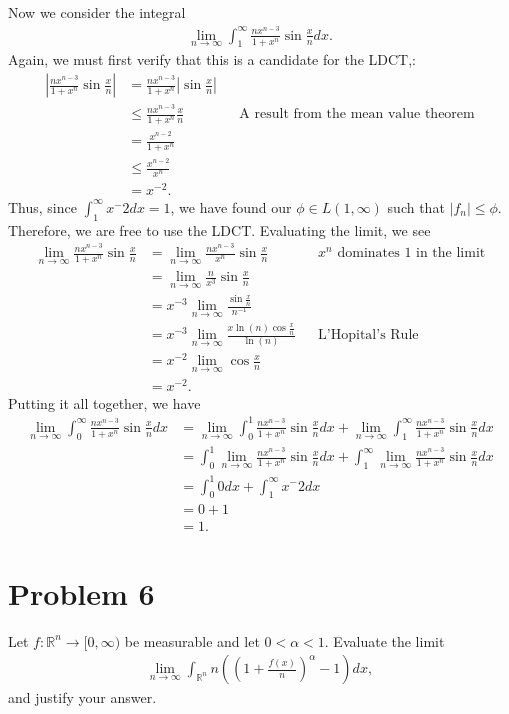 \documentclass[10pt,a4paper]{article}
\theoremstyle{theorem}
\theoremstyle{definition}
\begin{document}
Now we consider the integral 
\begin{align*}
\lim_{n \to \infty} \int_1^\infty \frac{n x^{n - 3}}{1 + x^n}\sin \frac{x}{n} dx.
\end{align*}
Again, we must first verify that this is a candidate for the LDCT,:
\begin{align*}
\left|\frac{n x^{n - 3}}{1 + x^n}\sin \frac{x}{n} \right| &= \frac{n x^{n - 3}}{1 + x^n} \left| \sin \frac{x}{n} \right|\\
&\leq \frac{n x^{n - 3}}{1 + x^n} \frac{x}{n} &&\text{A result from the mean value theorem}\\
&= \frac{x^{n - 2}}{1 + x^n}\\
&\leq \frac{x^{n - 2}}{x^n}\\
&= x^{-2}.
\end{align*}
Thus, since $\int_1^\infty x^-2 dx = 1$,  we have found our $\phi \in L(1, \infty)$ such that $|f_n| \leq \phi$. Therefore, we are free to use the LDCT.  Evaluating the limit, we see
\begin{align*}
\lim_{n \to \infty} \frac{n x^{n - 3}}{1 + x^n}\sin \frac{x}{n} &= \lim_{n \to \infty} \frac{n x^{n - 3}}{x^n}\sin \frac{x}{n} && x^n \text{ dominates 1 in the limit}\\
&=\lim_{n \to \infty} \frac{n}{x^3}\sin \frac{x}{n}\\
&= x^{-3} \lim_{n \to \infty} \frac{\sin \frac{x}{n}}{n^{-1}}\\
&=x^{-3} \lim_{n \to \infty} \frac{x\ln(n) \cos \frac{x}{n}}{\ln(n)}&&\text{L'Hopital's Rule}\\
&= x^{-2} \lim_{n \to \infty} \cos\frac{x}{n}\\
&= x^{-2}.
\end{align*}
Putting it all together, we have
\begin{align*}
\lim_{n \to \infty} \int_0^\infty \frac{n x^{n - 3}}{1 + x^n}\sin \frac{x}{n} dx &= \lim_{n \to \infty} \int_0^1 \frac{n x^{n - 3}}{1 + x^n}\sin \frac{x}{n} dx + \lim_{n \to \infty} \int_1^\infty \frac{n x^{n - 3}}{1 + x^n}\sin \frac{x}{n} dx\\
&= \int_0^1  \lim_{n \to \infty} \frac{n x^{n - 3}}{1 + x^n}\sin \frac{x}{n} dx + \int_1^\infty  \lim_{n \to \infty} \frac{n x^{n - 3}}{1 + x^n}\sin \frac{x}{n} dx\\
&= \int_0^1 0 dx + \int_1^\infty x^-2 dx\\
&= 0 + 1\\
&= 1.
\end{align*}

\section*{Problem 6}
Let $f: \mathbb{R}^n \to [0, \infty)$ be measurable and let $0 < \alpha < 1$. Evaluate the limit 
\begin{align*}
\lim_{n \to \infty} \int_{\mathbb{R}^n} n \left( \left( 1 + \frac{f(x)}{n} \right)^ \alpha - 1 \right) dx,
\end{align*}
and justify your answer.
\end{document}
